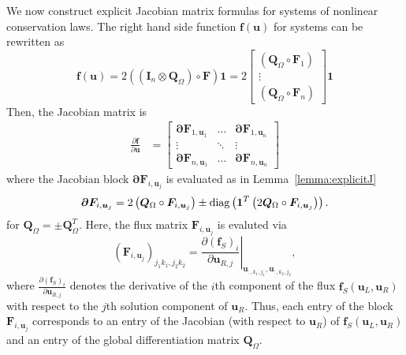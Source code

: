 \documentclass{article}
\newcommand{\diag}[1]{{\rm diag}\LRp{#1}}
\newcommand{\pd}[2]{\frac{\partial#1}{\partial#2}}
\newcommand{\LRp}[1]{\left( #1 \right)}
\newcommand{\LRl}[1]{\left. #1 \right|}
\newcommand{\note}[1]{{\color{blue}{#1}}}
\newcommand{\eqlab}[1]{\begin{align}#1\end{align}}
\newcommand{\bmat}[1]{\begin{bmatrix}#1\end{bmatrix}}
\begin{document}
We now construct explicit Jacobian matrix formulas for systems of nonlinear conservation laws.  The right hand side function $\bm{f}(\bm{u})$ for systems can be rewritten as
\[
\bm{f}(\bm{u}) = 2\LRp{ \LRp{\bm{I}_n\otimes\bm{Q}_{\Omega}} \circ \bm{F}}\bm{1} 
= 2\bmat{(\bm{Q}_{\Omega}\circ \bm{F}_1) \\ 
\vdots\\
(\bm{Q}_{\Omega}\circ \bm{F}_n)
}\bm{1}
\]
Then, the Jacobian matrix is 
\eqlab{
\pd{\bm{f}}{\bm{u}} &=
\bmat{
\bm{\partial F}_{1,\bm{u}_1} & \ldots & \bm{\partial F}_{1,\bm{u}_n}\\
\vdots & \ddots & \vdots\\
\bm{\partial F}_{n,\bm{u}_1} & \ldots & \bm{\partial F}_{n,\bm{u}_n}
}
}
where the Jacobian block $\bm{\partial F}_{i,\bm{u}_j}$ is evaluated as in Lemma~\ref{lemma:explicitJ}
\[
\bm{\partial F}_{i,\bm{u}_j} = 2 \LRp{\bm{Q}_{\Omega} \circ \bm{F}_{i,\bm{u}_j}} \pm \diag{\bm{1}^T\LRp{2\bm{Q}_{\Omega}\circ \bm{F}_{i,\bm{u}_j}}}.
\]
for $\bm{Q}_{\Omega} = \pm \bm{Q}_{\Omega}^T$.  
Here, the flux matrix $\bm{F}_{i,\bm{u}_j}$ is evaluted via
\[
\LRp{\bm{F}_{i,\bm{u}_j}}_{j_1k_1,j_2k_2} = \LRl{\pd{\LRp{\bm{f}_S}_i}{\bm{u}_{R,j}}}_{\bm{u}_{:,k_1,j_1},\bm{u}_{:,k_2,j_2}},
\]
where $\pd{\LRp{\bm{f}_S}_i}{\bm{u}_{R,j}}$ denotes the derivative of the $i$th component of the flux $\bm{f}_S\LRp{\bm{u}_L,\bm{u}_R}$ with respect to the $j$th solution component of $\bm{u}_R$.  Thus, each entry of the block $\bm{F}_{i,\bm{u}_j}$ corresponds to an entry of the Jacobian (with respect to $\bm{u}_R$) of $\bm{f}_S(\bm{u}_L,\bm{u}_R)$ and an entry of the global differentiation matrix $\bm{Q}_{\Omega}$.
\end{document}
